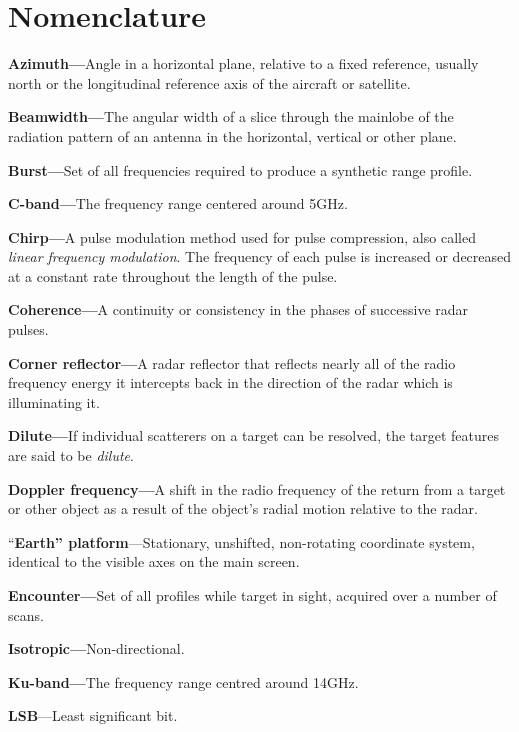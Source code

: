                       

\chapter*{Nomenclature}


\textbf{Azimuth---}Angle in a horizontal plane, relative to a fixed
reference, usually north or the longitudinal reference axis of the aircraft
or satellite.

\textbf{Beamwidth---}The angular width of a slice through the mainlobe of
the radiation pattern of an antenna in the horizontal, vertical or other
plane.

\textbf{Burst---}Set of all frequencies required to produce a synthetic
range profile.

\textbf{C-band---}The frequency range centered around 5\thinspace GHz.

\textbf{Chirp---}A pulse modulation method used for pulse compression, also
called \textit{linear frequency modulation}. The frequency of each pulse is
increased or decreased at a constant rate throughout the length of the pulse.

\textbf{Coherence---}A continuity or consistency in the phases of successive
radar pulses.

\textbf{Corner reflector---}A radar reflector that reflects nearly all of
the radio frequency energy it intercepts back in the direction of the radar
which is illuminating it.

\textbf{Dilute---}If individual scatterers on a target can be resolved, the
target features are said to be \textit{dilute}.

\textbf{Doppler frequency---}A shift in the radio frequency of the return
from a target or other object as a result of the object's radial motion
relative to the radar.

``\textbf{Earth'' platform}---Stationary, unshifted, non-rotating coordinate
system, identical to the visible axes on the main screen.

\textbf{Encounter---}Set of all profiles while target in sight, acquired
over a number of scans.

\textbf{Isotropic---}Non-directional.

\textbf{Ku-band---}The frequency range centred around 14\thinspace GHz.

\textbf{LSB}---Least significant bit.

